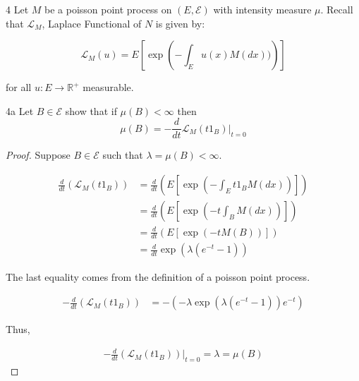 \documentclass{article}
\newcommand{\R}{\mathbb{R}}
\newcommand{\Ec}[0]{\mathcal{E}}
\newcommand{\Lc}[0]{\mathcal{L}}
\begin{document}
\bigskip

\begin{PROB}{4}\label{Problem 4.}
    Let $M$ be a poisson point process on $(E, \Ec)$ with intensity measure $\mu$. Recall that $\Lc_M$, Laplace Functional of $N$ is given by:
    
    \[\Lc_M(u) = E\left[\exp \left(-\int_{E} u(x) M(dx))\right) \right]\]

    for all $u: E \to \R^+$ measurable.  
\end{PROB}
\begin{claim}{4a}\label{Claim 4a.}
    Let $B \in \Ec$ show that if $\mu(B) < \infty$ then \[\mu(B) = -\frac{d}{dt}\Lc_M(t 1_B)|_{t = 0}\]   
\end{claim}
\begin{proof}
    Suppose $B \in \Ec$ such that $\lambda = \mu(B) < \infty$. 
    
    \begin{align*}
        \frac{d}{dt}\left(\Lc_M(t 1_B)\right) &= \frac{d}{dt}\left(E\left[\exp \left(- \int_{E} t 1_{B} M(dx)\right)\right]\right) \\
        &= \frac{d}{dt}\left(E\left[\exp\left(-t \int_{B} M(dx)\right)\right]\right) \\
        &= \frac{d}{dt}\left(E\left[\exp(-t M(B))\right]\right) \\
        &= \frac{d}{dt}\exp(\lambda(e^{-t} - 1))
    \end{align*}

    The last equality comes from the definition of a poisson point process. 

    \begin{align*}
        -\frac{d}{dt}\left(\Lc_M(t 1_B)\right) &= -(-\lambda\exp(\lambda(e^{-t} - 1))e^{-t})
    \end{align*}

    Thus, 

    \begin{align*}
        -\frac{d}{dt}\left(\Lc_M(t 1_B)\right)|_{t = 0} = \lambda = \mu(B)
    \end{align*}
\end{proof}
\end{document}
